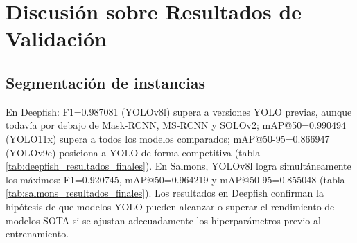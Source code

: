 \section{Discusión sobre Resultados de Validación}

\subsection{Segmentación de instancias}
En Deepfish: F1=0.987081 (YOLOv8l) supera a versiones YOLO previas, aunque todavía por debajo de Mask-RCNN, MS-RCNN y SOLOv2; mAP@50=0.990494 (YOLO11x) supera a todos los modelos comparados; mAP@50-95=0.866947 (YOLOv9e) posiciona a YOLO de forma competitiva (tabla \ref{tab:deepfish_resultados_finales}). En Salmons, YOLOv8l logra simultáneamente los máximos: F1=0.920745, mAP@50=0.964219 y mAP@50-95=0.855048 (tabla \ref{tab:salmons_resultados_finales}). Los resultados en Deepfish confirman la hipótesis de que modelos YOLO pueden alcanzar o superar el rendimiento de modelos SOTA si se ajustan adecuadamente los hiperparámetros previo al entrenamiento.

